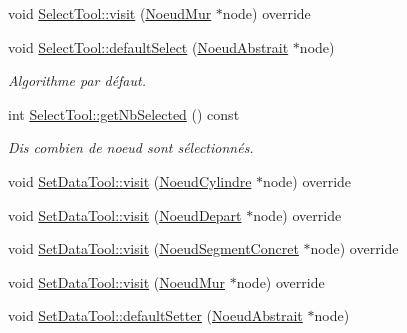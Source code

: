 \begin{DoxyCompactItemize}
\item 
void \hyperlink{group__inf2990_gab6a7d46d8fad7c1045678b6dec3c9400}{Select\+Tool\+::visit} (\hyperlink{class_noeud_mur}{Noeud\+Mur} $\ast$node) override
\item 
void \hyperlink{group__inf2990_ga01b8ec1322baa74ee48e5087337bc959}{Select\+Tool\+::default\+Select} (\hyperlink{class_noeud_abstrait}{Noeud\+Abstrait} $\ast$node)
\begin{DoxyCompactList}\small\item\em Algorithme par défaut. \end{DoxyCompactList}\item 
int \hyperlink{group__inf2990_gaca4f60cc972b5d9df612f48c18c8364a}{Select\+Tool\+::get\+Nb\+Selected} () const 
\begin{DoxyCompactList}\small\item\em Dis combien de noeud sont sélectionnés. \end{DoxyCompactList}\item 
void \hyperlink{group__inf2990_gaab929a1ed9e3f6a2e80a15aef5de8f71}{Set\+Data\+Tool\+::visit} (\hyperlink{class_noeud_cylindre}{Noeud\+Cylindre} $\ast$node) override
\item 
void \hyperlink{group__inf2990_gabe996cec1a80bdb4a10383bf4716532d}{Set\+Data\+Tool\+::visit} (\hyperlink{class_noeud_depart}{Noeud\+Depart} $\ast$node) override
\item 
void \hyperlink{group__inf2990_ga5c1484b543077d2a267347edff94266c}{Set\+Data\+Tool\+::visit} (\hyperlink{class_noeud_segment_concret}{Noeud\+Segment\+Concret} $\ast$node) override
\item 
void \hyperlink{group__inf2990_ga5833b6797fd9a603bedd502431fc76cc}{Set\+Data\+Tool\+::visit} (\hyperlink{class_noeud_mur}{Noeud\+Mur} $\ast$node) override
\item 
\hypertarget{group__inf2990_ga410f169c9f53a3a018bce606e0ba9f23}{}void \hyperlink{group__inf2990_ga410f169c9f53a3a018bce606e0ba9f23}{Set\+Data\+Tool\+::default\+Setter} (\hyperlink{class_noeud_abstrait}{Noeud\+Abstrait} $\ast$node)\label{group__inf2990_ga410f169c9f53a3a018bce606e0ba9f23}


\end{DoxyCompactItemize}
